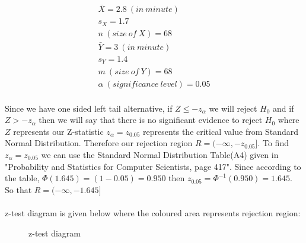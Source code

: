 \documentclass[12pt]{article}
\begin{document}
\begin{equation} 
\begin{split}
\bar{X} = 2.8 \ (in \ minute) \\
s_{X} = 1.7 \\
n \ (size \ of \ X) = 68 \\
\bar{Y} = 3 \ (in \ minute) \\
s_{Y}  = 1.4 \\
m \ (size \ of \ Y) = 68 \\
\alpha \ (significance \ level) = 0.05 \\
\end{split}
\end{equation}

Since we have one sided left tail alternative, if $Z \leq -z_{\alpha}$ we will reject $H_{0}$ and if $Z > -z_{\alpha}$ then we will say that there is no significant evidence to reject $H_{0}$ where $Z$ represents our Z-statistic $z_{\alpha} = z_{0.05}$ represents the critical value from Standard Normal Distribution. Therefore our rejection region $R = (-\infty,-z_{0.05}]$. To find $z_{\alpha} = z_{0.05}$ we can use the Standard Normal Distribution Table(A4) given in "Probability and Statistics for Computer Scientists, page 417". Since according to the table, $\Phi(1.645) = (1-0.05) = 0.950$ then $z_{0.05} = \Phi^{-1}(0.950) = 1.645$. So that $R = (-\infty,-1.645]$  \\ \\
z-test diagram is given below where the coloured area represents rejection region: 

\begin{figure}[H]
	\centering
	\caption{z-test diagram}
\end{figure}
\end{document}
